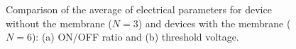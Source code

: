\begin{figure}
    \centering
    \hfill
    \caption{Comparison of the average of electrical parameters for device without the membrane ($N = 3$) and devices with the membrane ($N = 6$): (a) ON/OFF ratio and (b) threshold voltage.}
    \label{fig:avgParamsCfr}
\end{figure}

